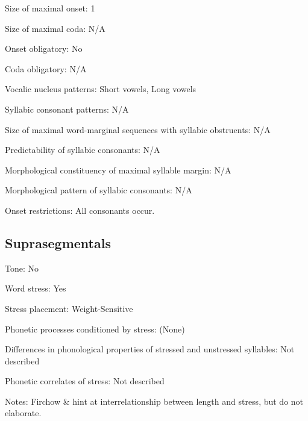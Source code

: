 {\begin{appendixdesc}
\item[Size of maximal onset:] 1

\item[Size of maximal coda:] N/A

\item[Onset obligatory:] No

\item[Coda obligatory:] N/A

\item[Vocalic nucleus patterns:] Short vowels, Long vowels

\item[Syllabic consonant patterns:] N/A

\item[Size of maximal word-marginal sequences with syllabic obstruents:] N/A

\item[Predictability of syllabic consonants:] N/A

\item[Morphological constituency of maximal syllable margin:] N/A

\item[Morphological pattern of syllabic consonants:] N/A

\item[Onset restrictions:] All consonants occur.
\end{appendixdesc}
\subsection*{Suprasegmentals}
\begin{appendixdesc}
\item[Tone:] No

\item[Word stress:] Yes

\item[Stress placement:] Weight-Sensitive

\item[Phonetic processes conditioned by stress:] (None)

\item[Differences in phonological properties of stressed and unstressed syllables:] Not described

\item[Phonetic correlates of stress:] Not described

\item[Notes:] Firchow \& \citet[271]{Firchow1969} hint at interrelationship between length and stress, but do not elaborate.
\end{appendixdesc}
}
